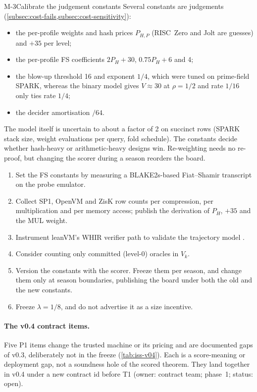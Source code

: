 \begin{issue}{M-3}{Calibrate the judgement constants}
\IRprob Several constants are judgements (\cref{subsec:cost-fails,subsec:cost-sensitivity}):
\begin{itemize}[nosep]
\item the per-profile weights and hash prices $P_{H,P}$ (RISC~Zero and Jolt are guesses) and $+35$
  per level;
\item the per-profile FS coefficients $2P_H+30$, $0.75P_H+6$ and 4;
\item the blow-up threshold 16 and exponent $1/4$, which were tuned on prime-field SPARK, whereas the
  binary model gives $V\approx30$ at $\rho=1/2$ and rate $1/16$ only ties rate $1/4$;
\item the decider amortisation $/64$.
\end{itemize}
The model itself is uncertain to about a factor of 2 on succinct rows (SPARK stack size,
weight evaluations per query, fold schedule).
\IRwhy The constants decide whether hash-heavy or arithmetic-heavy designs win. Re-weighting needs
no re-proof, but changing the scorer during a season reorders the board.
\IRres
\begin{enumerate}[nosep,leftmargin=1.4em]
\item Set the FS constants by measuring a BLAKE2s-based Fiat--Shamir transcript on the probe
  emulator.
\item Collect SP1, OpenVM and ZisK row counts per compression, per multiplication and per memory
  access; publish the derivation of $P_H$, $+35$ and the MUL weight.
\item Instrument leanVM's WHIR verifier path to validate the trajectory model \cite{leanVM}.
\item Consider counting only committed (level-0) oracles in $V_k$.
\item Version the constants with the scorer. Freeze them per season, and change them only at
  season boundaries, publishing the board under both the old and the new constants.
\item Freeze $\lambda=1/8$, and do not advertise it as a size incentive.
\end{enumerate}
\end{issue}

\paragraph{The v0.4 contract items.} Five P1 items change the trusted machine or its pricing and
are documented gaps of v0.3, deliberately not in the freeze (\cref{tab:iss-v04}). Each is a
score-meaning or deployment gap, not a soundness hole of the scored theorem. They land together in
v0.4 under a new contract id before T1 (owner: contract team; phase~1; status: open).

